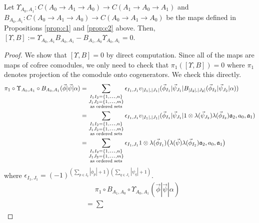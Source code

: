 \begin{prop}
\label{prop:c3}
Let $\Upsilon_{A_0,A_1}: 
C(A_0 \to A_1 \to A_0) \longrightarrow
C(A_1 \to A_0 \to A_1)$ and 
$B_{A_0,A_1}:C(A_0 \to A_1 \to A_0) 
\longrightarrow C(A_0 \to A_1 \to A_0)$ 
be the maps defined in Propositions 
\ref{prop:c1} and \ref{prop:c2} above. 
Then, $[\Upsilon, B] := 
\Upsilon_{A_0,A_1} B_{A_0,A_1} - 
B_{A_1,A_0}\Upsilon_{A_0,A_1} = 0$.
\end{prop}
%
\begin{proof}
We show that $[\Upsilon, B] = 0$ by direct 
computation. Since all of the maps are maps 
of cofree comodules, we only need to check 
that $\pi_1([\Upsilon, B]) = 0$ where 
$\pi_1$ denotes projection of the comodule 
onto cogenerators. We check this directly.
%
\begin{equation*}
\begin{aligned}
\pi_1 \circ \Upsilon_{A_0,A_1} \circ B_{A_0,A_1} 
  (\vec{\phi} | \vec{\psi} | \alpha ) 
&= 
\sum \limits_{\substack{
  I_1I_2 = \{1,\smdots,n\}\\
  J_1J_2 = \{1,\smdots,m\}\\
  \textrm{as ordered sets}}}
\epsilon_{I_1,J_1}  
  \upsilon_{|I_1|, |J_1|} (\vec{\phi}_{I_1} | \vec{\psi}_{J_1} | 
    B_{|I_2|, |J_2|} (\vec{\phi}_{I_2} | \vec{\psi}_{J_2} | \alpha)) \\
&= 
\sum \limits_{\substack{
  I_1I_2 = \{1,\smdots,n\}\\
  J_1J_2 = \{1,\smdots,m\}\\
  \textrm{as ordered sets}}}
\epsilon_{I_1,J_1}  
\upsilon_{|I_1|, |J_1|} (\vec{\phi}_{I_1} | \vec{\psi}_{J_1} | 
  1 \otimes \lambda(\vec{\psi}_{J_2}) \lambda(\vec{\phi}_{I_2}) 
  \mathfrak{a}_2, a_0, \mathfrak{a}_1) \\
&= 
\sum \limits_{\substack{
  I_1I_2 = \{1,\smdots,n\}\\
  J_1J_2 = \{1,\smdots,m\}\\
  \textrm{as ordered sets}}}
\epsilon_{I_1,J_1}  
1 \otimes \lambda(\vec{\phi}_{I_1}) \big( 
  \lambda(\vec{\psi}) \lambda(\vec{\phi}_{I_2}) 
  \mathfrak{a}_2, a_0, \mathfrak{a}_1 \big)
\end{aligned}
\end{equation*}
where $\epsilon_{I_1,J_1} = 
(-1)^{(\sum \limits_{p\in I_2}|\phi_p|+1)
(\sum \limits_{q \in J_1}|\psi_q|+1)}$.
%
\begin{align*}
& \phantom{{}={}}
\pi_1 \circ B_{A_1,A_0} \circ \Upsilon_{A_0,A_1} 
  (\vec{\phi} | \vec{\psi} | \alpha ) \\
&=
\sum \limits_{\substack{
}}
\end{align*}
\end{proof}
